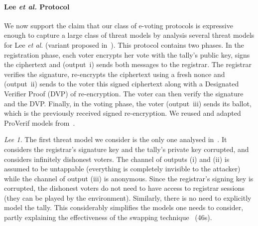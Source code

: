 \paragraph{\bf Lee \textit{et al.} Protocol~\cite{DKR-jcs09}}
\label{sec:caseStudies:LEE}
We now support the claim that our class of e-voting protocols is expressive enough
to capture a large class of threat models
by analysis several threat models
for Lee \textit{et al.} (variant proposed in~\cite{DKR-jcs09}).
This protocol contains two phases. In the registration phase,
each voter encrypts her vote with the tally's public key, signs the ciphertext and (output~i) sends both messages
to the registrar.
The registrar verifies the signature, re-encrypts the ciphertext using a fresh nonce
and (output~ii) sends to the voter this signed ciphertext along with a Designated Verifier Proof (DVP) of re-encryption.
The voter can then verify the signature and the DVP.
Finally, in the voting phase, the voter (output~iii) sends its ballot,
which is the previously received signed re-encryption.
We reused and adapted ProVerif models from~\cite{vote-CSF16}.

\noindent
\textit{Lee 1.}
The first threat model we consider is the only one analysed in~\cite{vote-CSF16}.
It considers the registrar's signature key and the tally's private key
corrupted, and considers infinitely dishonest voters.
The channel of outputs (i) and (ii) %
is assumed to be untappable
(\ie everything is completely invisible to the attacker)
while the channel of output (iii) is anonymous.
Since the registrar's signing key is corrupted, the dishonest voters do not need to have access to
registrar sessions (they can be played by the environment).
Similarly, %
there is no need to explicitly model the tally.
This considerably simplifies the models one needs to consider, partly explaining
the effectiveness of the swapping technique~\cite{vote-CSF16}  (46s).

